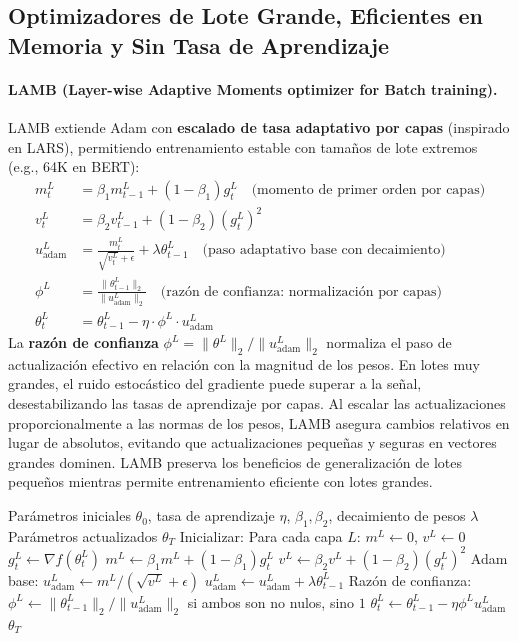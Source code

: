 \documentclass[11pt,a4paper]{article}
\begin{document}
\subsection{Optimizadores de Lote Grande, Eficientes en Memoria y Sin Tasa de Aprendizaje}
\paragraph{LAMB (Layer-wise Adaptive Moments optimizer for Batch training).}
LAMB extiende Adam con \textbf{escalado de tasa adaptativo por capas} (inspirado en LARS), permitiendo entrenamiento estable con tamaños de lote extremos (e.g., 64K en BERT):
\begin{align}
m_t^L &= \beta_1 m_{t-1}^L + (1-\beta_1)g_t^L \quad\text{(momento de primer orden por capas)} \\
v_t^L &= \beta_2 v_{t-1}^L + (1-\beta_2)(g_t^L)^2 \\
u_{\text{adam}}^L &= \frac{m_t^L}{\sqrt{v_t^L}+\epsilon} + \lambda\theta_{t-1}^L \quad\text{(paso adaptativo base con decaimiento)} \\
\phi^L &= \frac{\|\theta_{t-1}^L\|_2}{\|u_{\text{adam}}^L\|_2} \quad\text{(razón de confianza: normalización por capas)} \\
\theta_t^L &= \theta_{t-1}^L - \eta \cdot \phi^L \cdot u_{\text{adam}}^L
\end{align}
La \textbf{razón de confianza} $\phi^L = \|\theta^L\|_2 / \|u_{\text{adam}}^L\|_2$ normaliza el paso de actualización efectivo en relación con la magnitud de los pesos. En lotes muy grandes, el ruido estocástico del gradiente puede superar a la señal, desestabilizando las tasas de aprendizaje por capas. Al escalar las actualizaciones proporcionalmente a las normas de los pesos, LAMB asegura cambios relativos en lugar de absolutos, evitando que actualizaciones pequeñas y seguras en vectores grandes dominen. LAMB preserva los beneficios de generalización de lotes pequeños mientras permite entrenamiento eficiente con lotes grandes.

\begin{algorithm}[H]
\caption{LAMB (Layer-wise Adaptive Moments optimizer for Batch training)}
\label{alg:lamb}
\begin{algorithmic}[1]
\Require Parámetros iniciales $\theta_0$, tasa de aprendizaje $\eta$, $\beta_1, \beta_2$, decaimiento de pesos $\lambda$
\Ensure Parámetros actualizados $\theta_T$
\State Inicializar: Para cada capa $L$: $m^L \gets 0$, $v^L \gets 0$
        \State $g_t^L \gets \nabla f(\theta_t^L)$
        \State $m^L \gets \beta_1 m^L + (1-\beta_1) g_t^L$
        \State $v^L \gets \beta_2 v^L + (1-\beta_2) (g_t^L)^2$
        \State Adam base: $u_{\text{adam}}^L \gets m^L / (\sqrt{v^L} + \epsilon)$
            \State $u_{\text{adam}}^L \gets u_{\text{adam}}^L + \lambda \theta_{t-1}^L$
        \EndIf
        \State Razón de confianza: $\phi^L \gets \|\theta_{t-1}^L\|_2 / \|u_{\text{adam}}^L\|_2$ si ambos son no nulos, sino $1$
        \State $\theta_t^L \gets \theta_{t-1}^L - \eta \phi^L u_{\text{adam}}^L$
    \EndFor
\EndFor
\Return $\theta_T$
\end{algorithmic}
\end{algorithm}
\end{document}
